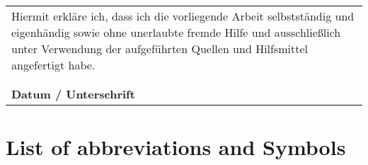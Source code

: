 \documentclass[12pt,a4paper,twoside]{book}
\begin{document}
\pagestyle{plain}




\clearpage
{\pagestyle{empty}\cleardoublepage}%



\begin{minipage}[b][12cm]{\textwidth}
	\begin{center}
		\begin{tabular}{m{12cm}}
			\large{Hiermit erkläre ich, dass ich die vorliegende Arbeit selbstständig und eigenhändig sowie ohne unerlaubte fremde Hilfe und ausschließlich unter Verwendung der aufgeführten Quellen und Hilfsmittel angefertigt habe. }				\\
											\\
											\\
			\midrule
			\textbf{Datum / Unterschrift}	\\
		\end{tabular}
	\end{center}
\end{minipage}

\cleardoublepage
\setlength{\parskip}{3mm}

\onehalfspacing

\cleardoublepage


\singlespacing
\begingroup
\setlength{\parskip}{2mm}
\setcounter{tocdepth}{5}
\tableofcontents
\cleardoublepage
\endgroup

\begingroup
\let\cleardoublepage\relax
\setlength{\parskip}{1mm}
\listoffigures
\clearpage


\listoftables

\vspace{4cm}

\chapter*{List of abbreviations and Symbols}
\begin{acronym}[XXXXX]
\end{acronym}
\end{document}
